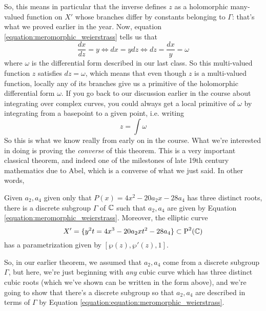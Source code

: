 \documentclass{article}
\begin{document}
So, this means in particular that the inverse defines \(z\) as a holomorphic many-valued function on \(X'\) whose branches differ by constants belonging to \(\Gamma\): that's what we proved earlier in the year. Now, equation \ref{equation:meromorphic_weierstrass} tells us that
\begin{equation}
\frac{dx}{dz} = y \iff dx = ydz \iff dz = \frac{dx}{y} = \omega
\end{equation}
where \(\omega\) is the differential form described in our last class. So this multi-valued function \(z\) satisfies \(dz = \omega\), which means that even though \(z\) is a multi-valued function, locally any of its branches give us a primitive of the holomorphic differential form \(\omega\). If you go back to our discussion earlier in the course about integrating over complex curves, you could always get a local primitive of \(\omega\) by integrating from a basepoint to a given point, i.e. writing
\begin{equation}
  z = \int\omega
\end{equation}
So this is what we know really from early on in the course. What we're interested in doing is proving the \textit{converse} of this theorem. This is a very important classical theorem, and indeed one of the milestones of late 19th century mathematics due to Abel, which is a converse of what we just said. In other words,
\begin{theorem}
Given \(a_2, a_4\) given only that \(P(x) = 4x^2 - 20a_2x - 28a_4\) has three distinct roots, there is a discrete subgroup \(\Gamma\) of \(\mathbb{C}\) such that \(a_2, a_4\) are given by Equation \ref{equation:meromorphic_weierstrass}. Moreover, the elliptic curve
\[X' = \{y^2t = 4x^3 - 20a_2xt^2 - 28a_4\} \subset \operatorname{P}^{2}({\mathbb{C}})\]
has a parametrization given by \([\wp(z), \wp'(z), 1]\).
\end{theorem}
So, in our earlier theorem, we assumed that \(a_2, a_4\) come from a discrete subgroup \(\Gamma\), but here, we're just beginning with \textit{any} cubic curve which has three distinct cubic roots (which we've shown can be written in the form above), and we're going to show that there's a discrete subgroup so that \(a_2, a_4\) are described in terms of \(\Gamma\) by Equation \ref{equation:equation:meromorphic_weierstrass}.
\end{document}
